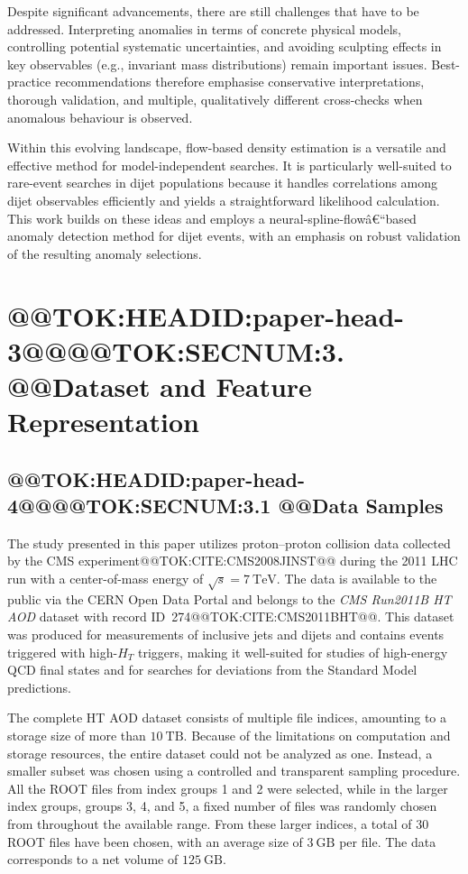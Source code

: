 \documentclass[11pt]{article}
\begin{document}
Despite significant advancements, there are still challenges that have to be addressed. Interpreting anomalies in terms of concrete physical models, controlling potential systematic uncertainties, and avoiding sculpting effects in key observables (e.g., invariant mass distributions) remain important issues. Best-practice recommendations therefore emphasise conservative interpretations, thorough validation, and multiple, qualitatively different cross-checks when anomalous behaviour is observed.

Within this evolving landscape, flow-based density estimation is a versatile and effective method for model-independent searches. It is particularly well-suited to rare-event searches in dijet populations because it handles correlations among dijet observables efficiently and yields a straightforward likelihood calculation. This work builds on these ideas and employs a neural-spline-flowâ€“based anomaly detection method for dijet events, with an emphasis on robust validation of the resulting anomaly selections.

\section{@@TOK:HEADID:paper-head-3@@@@TOK:SECNUM:3. @@Dataset and Feature Representation}

\subsection{@@TOK:HEADID:paper-head-4@@@@TOK:SECNUM:3.1 @@Data Samples}

The study presented in this paper utilizes proton--proton collision data collected by the CMS experiment@@TOK:CITE:CMS2008JINST@@ during the 2011 LHC run with a center-of-mass energy of $\sqrt{s} = 7~\mathrm{TeV}$. The data is available to the public via the CERN Open Data Portal and belongs to the \emph{CMS Run2011B HT AOD} dataset with record ID~274@@TOK:CITE:CMS2011BHT@@. This dataset was produced for measurements of inclusive jets and dijets and contains events triggered with high-$H_T$ triggers, making it well-suited for studies of high-energy QCD final states and for searches for deviations from the Standard Model predictions.

The complete HT AOD dataset consists of multiple file indices, amounting to a storage size of more than $10~\mathrm{TB}$. Because of the limitations on computation and storage resources, the entire dataset could not be analyzed as one. Instead, a smaller subset was chosen using a controlled and transparent sampling procedure. All the ROOT files from index groups 1 and 2 were selected, while in the larger index groups, groups 3, 4, and 5, a fixed number of files was randomly chosen from throughout the available range. From these larger indices, a total of $30$ ROOT files have been chosen, with an average size of $3~\mathrm{GB}$ per file. The data corresponds to a net volume of $125~\mathrm{GB}$.
\end{document}
